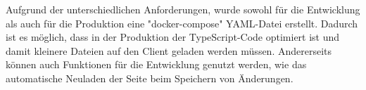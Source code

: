 
Aufgrund der unterschiedlichen Anforderungen, wurde sowohl für die Entwicklung als auch für die Produktion eine "docker-compose" YAML-Datei erstellt. 
Dadurch ist es möglich, dass in der Produktion der TypeScript-Code optimiert ist und damit kleinere Dateien auf den Client geladen werden müssen. 
Andererseits können auch Funktionen für die Entwicklung genutzt werden, wie das automatische Neuladen der Seite beim Speichern von Änderungen.



